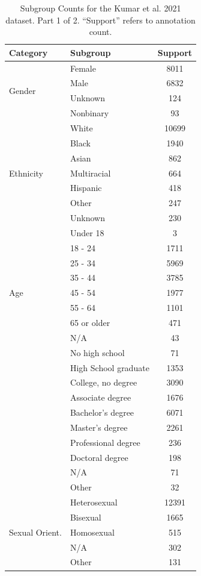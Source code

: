 \documentclass{article} %
\theoremstyle{definition}
\theoremstyle{plain}
\begin{document}
\begin{table}[t]
	\centering
	\small
	\begin{tabular}{llc}
		\toprule
		\textbf{Category} & \textbf{Subgroup} & \textbf{Support}\\
		\midrule
		\multirow{4}{*}{Gender} & Female & 8011 \\
		& Male & 6832 \\
		& Unknown & 124 \\
		& Nonbinary & 93 \\
		\midrule
		\multirow{7}{*}{Ethnicity} & White & 10699 \\
		& Black & 1940 \\
		& Asian & 862 \\
		& Multiracial & 664 \\
		& Hispanic & 418 \\
		& Other & 247 \\
		& Unknown & 230 \\
		\midrule
		\multirow{9}{*}{Age} & Under 18 & 3 \\
		& 18 - 24 & 1711 \\
		& 25 - 34 & 5969 \\
		& 35 - 44 & 3785 \\
		& 45 - 54 & 1977 \\
		& 55 - 64 & 1101 \\
		& 65 or older & 471 \\
		& N/A & 43 \\
		\midrule
		\multirow{10}{*}{Education} & No high school & 71 \\
		& High School graduate & 1353 \\
		& College, no degree & 3090 \\
		& Associate degree & 1676 \\
		& Bachelor's degree & 6071 \\
		& Master's degree & 2261 \\
		& Professional degree & 236 \\
		& Doctoral degree & 198 \\
		& N/A & 71 \\
		& Other & 32 \\
		\midrule
		\multirow{5}{*}{Sexual Orient.} & Heterosexual & 12391 \\
		& Bisexual & 1665 \\
		& Homosexual & 515 \\
		& N/A & 302 \\
		& Other & 131 \\
		\bottomrule
	\end{tabular}
	\caption{Subgroup Counts for the Kumar et al. 2021 dataset. Part 1 of 2. ``Support'' refers to annotation count.}
	\label{tab:kumar-stats1}
\end{table}
\end{document}
